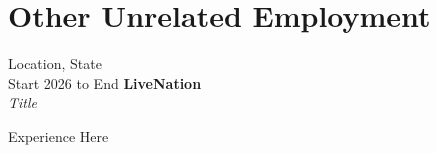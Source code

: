 \section{Other Unrelated Employment}
    \begin{twocolentry}{Location, State \\ Start 2026 to End}
        \textbf{LiveNation}\\
        \textit{Title}
    \end{twocolentry}

    \vspace{0.10 cm}
    \begin{onecolentry}
        \begin{highlights}
        	\item Experience Here
        \end{highlights}
    \end{onecolentry}  
    
    \vspace{0.20 cm}